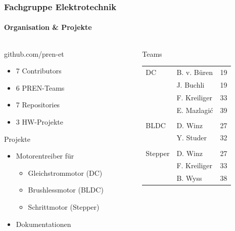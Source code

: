 \begin{frame}
	\frametitle{Fachgruppe Elektrotechnik \hfill{} \footnotesize \group}
	\framesubtitle{Organisation \& Projekte}
	\begin{columns}
		\begin{column}{0.5\textwidth}
			\begin{block}{github.com/pren-et}
				\begin{itemize}
					\item 7 Contributors
					\item 6 PREN-Teams
					\item 7 Repositories
					\item 3 HW-Projekte
				\end{itemize}
			\end{block}
			\begin{block}{Projekte}
				\begin{itemize}
					\item Motorentreiber für
						\begin{itemize}
							\item Gleichstrommotor (DC)
							\item Brushlessmotor (BLDC)
							\item Schrittmotor (Stepper)
						\end{itemize}
					\item Dokumentationen
				\end{itemize}
			\end{block}
		\end{column}
		\begin{column}{0.5\textwidth}
			\begin{exampleblock}{Teams}
				\begin{tabular}{l l r}
					DC
						& B. v. Büren 	& 19 \\
						& J. Buchli 	& 19 \\
						& F. Kreiliger	& 33 \\
						& E. Mazlagi\'c	& 39 \\
					& & \\
					BLDC
						& D. Winz	& 27 \\
						& Y. Studer	& 32 \\
					& & \\
					Stepper
						& D. Winz	& 27 \\
						& F. Kreiliger	& 33 \\
						& B. Wyss	& 38 \\
				\end{tabular}
			\end{exampleblock}
		\end{column}
	\end{columns}
\end{frame}

